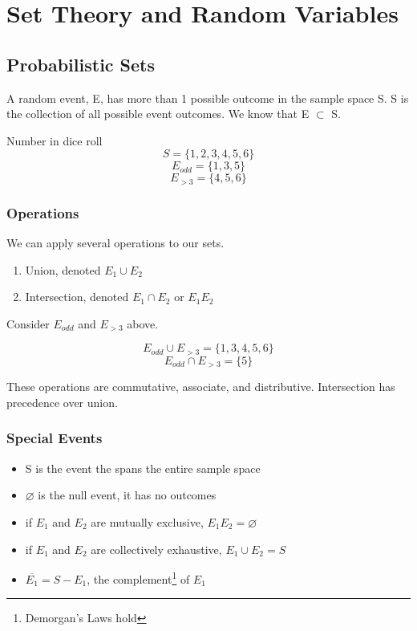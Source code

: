 \chapter{Set Theory and Random Variables}

\section{Probabilistic Sets}
A random event, E, has more than 1 possible outcome in the sample space S. S is the collection of all possible event outcomes. We know that E $\subset$ S.

\begin{example}
    Number in dice roll
    \[S = \{1, 2, 3, 4, 5, 6\}\]
    \[E_{odd} = \{1, 3, 5\}\]
    \[E_{>3} = \{4, 5, 6\}\]
\end{example}

\subsection*{Operations}
We can apply several operations to our sets.

\begin{enumerate}
    \item Union, denoted $E_1 \cup E_2$
    \item Intersection, denoted $E_1 \cap E_2$ or $E_1E_2$
\end{enumerate}

\vspace{.5cm}

Consider $E_{odd}$ and $E_{>3}$ above.

\[E_{odd} \cup E_{>3} = \{1, 3, 4, 5, 6\}\]
\[E_{odd} \cap E_{>3} = \{5\}\]

These operations are commutative, associate, and distributive. Intersection has precedence over union. 

\vspace{.5cm}

\subsection*{Special Events}
\begin{itemize}
    \item S is the event the spans the entire sample space
    \item $\varnothing$ is the null event, it has no outcomes
    \item if $E_1$ and $E_2$ are mutually exclusive, $E_1E_2 = \varnothing$
    \item if $E_1$ and $E_2$ are collectively exhaustive, $E_1 \cup E_2 = S$
    \item  $\overline{E_1} = S - E_1$, the complement\footnote[1]{Demorgan's Laws hold} of $E_1$  
\end{itemize}

